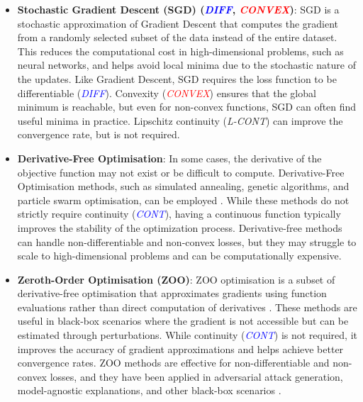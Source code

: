 \documentclass[sn-mathphys-num]{sn-jnl}%
\newcommand \cont{\textit{CONT}}
\newcommand \lcont{\textit{L-CONT}}
\newcommand \diff{\textit{DIFF}}
\newcommand \conv{\textit{CONVEX}}
\begin{document}
\begin{itemize}
    \item \textbf{Stochastic Gradient Descent (SGD) (\textcolor{blue}{\diff}, \textcolor{red}{\conv})}:
    SGD \cite{ML_2} is a stochastic approximation of Gradient Descent that computes the gradient from a randomly selected subset of the data instead of the entire dataset. This reduces the computational cost in high-dimensional problems, such as neural networks, and helps avoid local minima due to the stochastic nature of the updates. Like Gradient Descent, SGD requires the loss function to be differentiable (\textcolor{blue}{\diff}). Convexity (\textcolor{red}{\conv}) ensures that the global minimum is reachable, but even for non-convex functions, SGD can often find useful minima in practice. Lipschitz continuity (\lcont) can improve the convergence rate, but is not required.

    \item \textbf{Derivative-Free Optimisation}: 
In some cases, the derivative of the objective function may not exist or be difficult to compute. Derivative-Free Optimisation methods, such as simulated annealing, genetic algorithms, and particle swarm optimisation, can be employed \cite{derivative_free_opt_1,derivative_free_opt_2}. While these methods do not strictly require continuity (\textcolor{blue}{\cont}), having a continuous function typically improves the stability of the optimization process. Derivative-free methods can handle non-differentiable and non-convex losses, but they may struggle to scale to high-dimensional problems and can be computationally expensive.

\item \textbf{Zeroth-Order Optimisation (ZOO)}: 
ZOO optimisation is a subset of derivative-free optimisation that approximates gradients using function evaluations rather than direct computation of derivatives \cite{zeroth_optimisation_3}. These methods are useful in black-box scenarios where the gradient is not accessible but can be estimated through perturbations. While continuity (\textcolor{blue}{\cont}) is not required, it improves the accuracy of gradient approximations and helps achieve better convergence rates. ZOO methods are effective for non-differentiable and non-convex losses, and they have been applied in adversarial attack generation, model-agnostic explanations, and other black-box scenarios \cite{zeroth_optimisation_1,zeroth_optimisation_2}.

\end{itemize}
\end{document}
